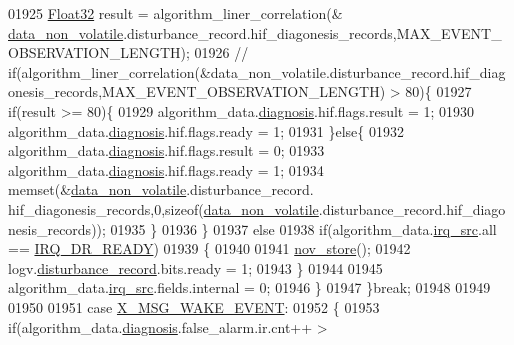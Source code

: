 \begin{DoxyCode}
{{{{{01925                         \hyperlink{a00072_a87d38f886e617ced2698fc55afa07637}{Float32} result = algorithm\_liner\_correlation(&
      \hyperlink{a00060_a76ac5f917f5308dcd83de0d7c94559fb}{data\_non\_volatile}.disturbance\_record.hif\_diagonesis\_records,MAX\_EVENT\_OBSERVATION\_LENGTH);
01926                        \textcolor{comment}{//
      if(algorithm\_liner\_correlation(&data\_non\_volatile.disturbance\_record.hif\_diagonesis\_records,MAX\_EVENT\_OBSERVATION\_LENGTH) > 80)\{}
01927                          \textcolor{keywordflow}{if}(result >= 80)\{
01929                             algorithm\_data.\hyperlink{a00016_a16f85d57ec98b4ad05f5a2e10536b3c6}{diagnosis}.hif.flags.result = 1;
01930                             algorithm\_data.\hyperlink{a00016_a16f85d57ec98b4ad05f5a2e10536b3c6}{diagnosis}.hif.flags.ready  = 1;
01931                          \}\textcolor{keywordflow}{else}\{
01932                             algorithm\_data.\hyperlink{a00016_a16f85d57ec98b4ad05f5a2e10536b3c6}{diagnosis}.hif.flags.result = 0;
01933                             algorithm\_data.\hyperlink{a00016_a16f85d57ec98b4ad05f5a2e10536b3c6}{diagnosis}.hif.flags.ready  = 1;
01934                             memset(&\hyperlink{a00060_a76ac5f917f5308dcd83de0d7c94559fb}{data\_non\_volatile}.disturbance\_record.
      hif\_diagonesis\_records,0,\textcolor{keyword}{sizeof}(\hyperlink{a00060_a76ac5f917f5308dcd83de0d7c94559fb}{data\_non\_volatile}.disturbance\_record.hif\_diagonesis\_records));
01935                          \}
01936                     \}
01937                     \textcolor{keywordflow}{else}
01938                     \textcolor{keywordflow}{if}(algorithm\_data.\hyperlink{a00016_a1aafd556b3c9ed3e5295b17dbd80cab8}{irq\_src}.all == \hyperlink{a00021_acfd80444497090bce928df199247a0ec}{IRQ\_DR\_READY})
01939                     \{
01940                         
01941                         \hyperlink{a00029_a90aef186f45a15d94bf0247122194991}{nov\_store}();
01942                         logv.\hyperlink{a00021_a11ed024c2cc5c53c79b2c0a8b35e3c06}{disturbance\_record}.bits.ready = 1;
01943                     \}
01944 
01945                     algorithm\_data.\hyperlink{a00016_a1aafd556b3c9ed3e5295b17dbd80cab8}{irq\_src}.fields.internal = 0;
01946          \}
01947         \}\textcolor{keywordflow}{break};
01948 
01949 
01950 
01951         \textcolor{keywordflow}{case} \hyperlink{a00016_ae6be514b1d949dc71420a3e549772995}{X\_MSG\_WAKE\_EVENT}:
01952         \{
01953               \textcolor{keywordflow}{if}(algorithm\_data.\hyperlink{a00016_a16f85d57ec98b4ad05f5a2e10536b3c6}{diagnosis}.false\_alarm.ir.cnt++ > 
}}}}}
\end{DoxyCode}
